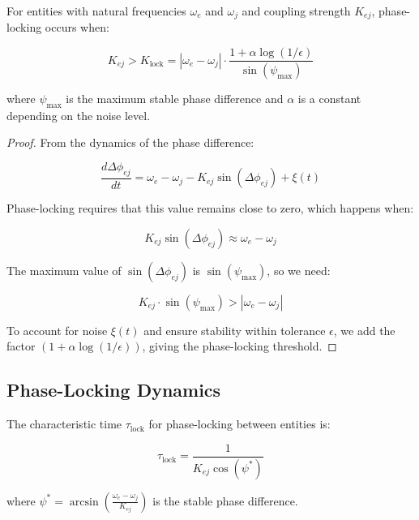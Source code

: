 \begin{theorem}
For entities with natural frequencies $\omega_e$ and $\omega_j$ and coupling strength $K_{ej}$, phase-locking occurs when:

\begin{equation}
K_{ej} > K_{\text{lock}} = |\omega_e - \omega_j| \cdot \frac{1 + \alpha \log(1/\epsilon)}{\sin(\psi_{\text{max}})}
\end{equation}

where $\psi_{\text{max}}$ is the maximum stable phase difference and $\alpha$ is a constant depending on the noise level.
\end{theorem}

\begin{proof}
From the dynamics of the phase difference:

\begin{equation}
\frac{d\Delta\phi_{ej}}{dt} = \omega_e - \omega_j - K_{ej}\sin(\Delta\phi_{ej}) + \xi(t)
\end{equation}

Phase-locking requires that this value remains close to zero, which happens when:

\begin{equation}
K_{ej}\sin(\Delta\phi_{ej}) \approx \omega_e - \omega_j
\end{equation}

The maximum value of $\sin(\Delta\phi_{ej})$ is $\sin(\psi_{\text{max}})$, so we need:

\begin{equation}
K_{ej} \cdot \sin(\psi_{\text{max}}) > |\omega_e - \omega_j|
\end{equation}

To account for noise $\xi(t)$ and ensure stability within tolerance $\epsilon$, we add the factor $(1 + \alpha \log(1/\epsilon))$, giving the phase-locking threshold.
\end{proof}

\subsection{Phase-Locking Dynamics}

\begin{theorem}
The characteristic time $\tau_{\text{lock}}$ for phase-locking between entities is:

\begin{equation}
\tau_{\text{lock}} = \frac{1}{K_{ej}\cos(\psi^*)}
\end{equation}

where $\psi^* = \arcsin\left(\frac{\omega_e - \omega_j}{K_{ej}}\right)$ is the stable phase difference.
\end{theorem}

